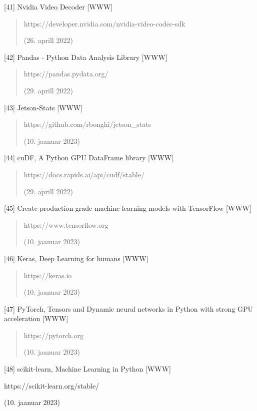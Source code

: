 \documentclass[12pt,a4paper]{report}
\begin{document}
{[}41{]} Nvidia Video Decoder {[}WWW{]}

\begin{quote}
https://developer.nvidia.com/nvidia-video-codec-sdk

(26. aprill 2022)
\end{quote}

{[}42{]} Pandas - Python Data Analysis Library {[}WWW{]}

\begin{quote}
https://pandas.pydata.org/

(29. aprill 2022)
\end{quote}

{[}43{]} Jetson-Stats {[}WWW{]}

\begin{quote}
https://github.com/rbonghi/jetson\_stats

(10. jaanuar 2023)
\end{quote}

{[}44{]} cuDF, A Python GPU DataFrame library {[}WWW{]}

\begin{quote}
https://docs.rapids.ai/api/cudf/stable/

(29. aprill 2022)
\end{quote}

{[}45{]} Create production-grade machine learning models with TensorFlow {[}WWW{]}

\begin{quote}
https://www.tensorflow.org

(10. jaanuar 2023)
\end{quote}

{[}46{]} Keras, Deep Learning for humans {[}WWW{]}

\begin{quote}
https://keras.io

(10. jaanuar 2023)
\end{quote}

{[}47{]} PyTorch, Tensors and Dynamic neural networks in Python with strong GPU acceleration {[}WWW{]}

\begin{quote}
https://pytorch.org

(10. jaanuar 2023)
\end{quote}

{[}48{]} scikit-learn, Machine Learning in Python {[}WWW{]}

https://scikit-learn.org/stable/

(10. jaanuar 2023)
\end{document}
